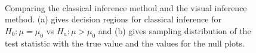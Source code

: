 \documentclass[12]{article}
\begin{document}

%

\begin{figure}[htbp]
\centering
\mbox{\quad
{}}
\caption{Comparing the classical inference method and the visual inference method.  (a) gives decision regions  for classical inference for $H_0: \mu=\mu_0$ vs $H_a:\mu>\mu_0$ and (b) gives sampling distribution of the test statistic with the true value and the values for the null plots.  } 
\label{compare}
\end{figure}
\end{document}
